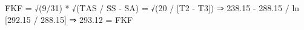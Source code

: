 F̄KF = √(9/31) * √(T̄AS / S̄S - S̄A) = √(20 / [T2 - T3]) 
⇒ 238.15 - 288.15 / ln [292.15 / 288.15] ⇒ 293.12 = F̄KF